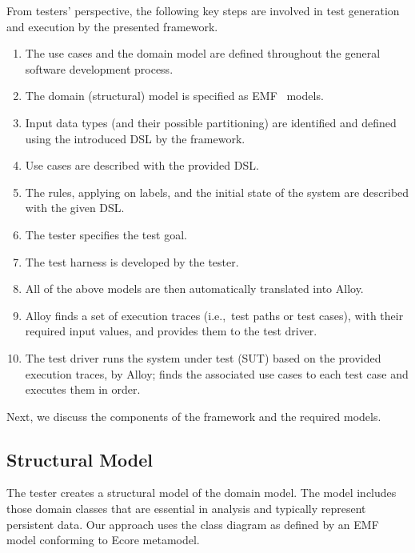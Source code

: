 From testers' perspective, the following key steps are involved in  test generation and execution by the presented framework.
\begin{enumerate}
	\item The use cases and the domain model are defined throughout the general software development process. 
	
	\item The domain (structural) model is specified as EMF~\cite{EMF} models. 
	
	\item Input data types (and their possible partitioning) are identified and defined using the introduced DSL by the framework. 
	
	\item Use cases are described with the provided DSL.
	
	\item The rules, applying on labels, and the initial state of the system are described with the given DSL.
	
	\item The tester specifies the test goal.
	
	\item The test harness is developed by the tester.
	
	\item All of the above models are then automatically translated into Alloy.
	
	\item Alloy finds a set of execution traces (i.e.,\ test paths or test cases), with their required input values, and provides them to the test driver.
	
	\item The test driver runs the system under test (SUT) based on the provided execution traces, by Alloy; finds the associated use cases to each test case and executes them in order.
\end{enumerate}

Next, we discuss the components of the framework and the required models. 

\subsection{Structural Model}
\label{sec:framework-overview-structure}
The tester creates a structural model of the domain model. The model includes those domain classes that are essential in analysis and typically represent persistent data. Our approach uses the class diagram as defined by an EMF model conforming to Ecore metamodel. %
 
